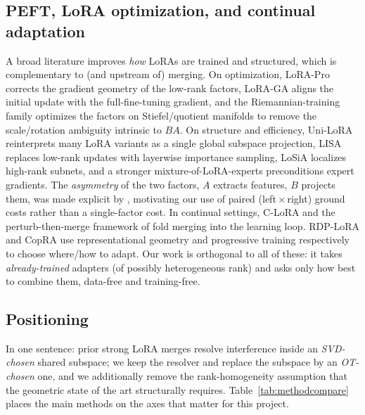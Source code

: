 \documentclass[11pt]{article}
\begin{document}
\subsection{PEFT, LoRA optimization, and continual adaptation}
A broad literature improves \emph{how} LoRAs are trained and structured, which is complementary to (and
upstream of) merging. On optimization, LoRA-Pro \citep{wang2024lorapro} corrects the gradient geometry of
the low-rank factors, LoRA-GA \citep{wang2024loraga} aligns the initial update with the full-fine-tuning
gradient, and the Riemannian-training family \citep{zhang2024riemannian,park2025stiefel,bogachev2025riemannlora}
optimizes the factors on Stiefel/quotient manifolds to remove the scale/rotation ambiguity intrinsic to
$BA$. On structure and efficiency, Uni-LoRA \citep{li2025unilora} reinterprets many LoRA variants as a
single global subspace projection, LISA \citep{pan2024lisa} replaces low-rank updates with layerwise
importance sampling, LoSiA \citep{wang2025losia} localizes high-rank subnets, and a stronger
mixture-of-LoRA-experts \citep{sun2025moelora} preconditions expert gradients. The
\emph{asymmetry} of the two factors, $A$ extracts features, $B$ projects them, was made explicit by
\citet{zhu2024asymmetry}, motivating our use of paired (left\,$\times$\,right) ground costs rather than a
single-factor cost. In continual settings, C-LoRA \citep{zhang2025clora} and the perturb-then-merge
framework of \citet{qiu2025perturbmerge} fold merging into the learning loop. RDP-LoRA
\citep{celebi2026rdplora} and CopRA \citep{zhuang2024copra} use representational geometry and progressive
training respectively to choose where/how to adapt. Our work is orthogonal to all of these: it takes
\emph{already-trained} adapters (of possibly heterogeneous rank) and asks only how best to combine them,
data-free and training-free.

\subsection{Positioning}
In one sentence: prior strong LoRA merges resolve interference inside an \emph{SVD-chosen} shared
subspace; we keep the resolver and replace the subspace by an \emph{OT-chosen} one, and we additionally
remove the rank-homogeneity assumption that the geometric state of the art structurally requires.
Table~\ref{tab:methodcompare} places the main methods on the axes that matter for this project.
\end{document}
